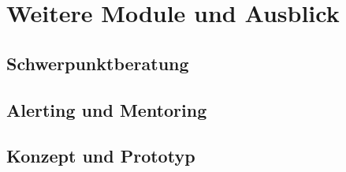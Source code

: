 \section{Weitere Module und Ausblick}
\label{sec:WeiteresAusblick}

\subsection{Schwerpunktberatung}
\subsection{Alerting und Mentoring}
\subsection{Konzept und Prototyp}
